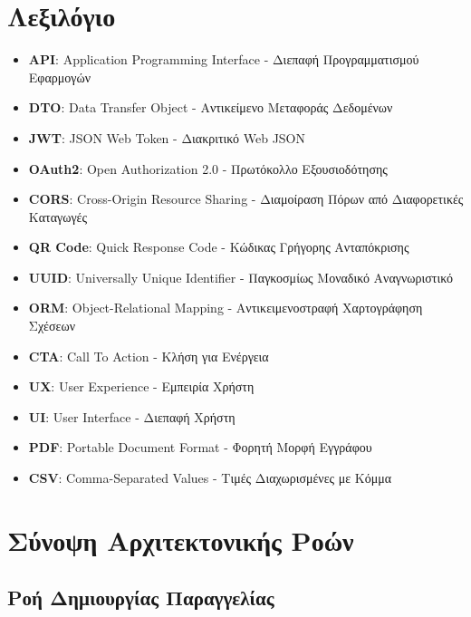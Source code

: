 \documentclass[12pt,a4paper]{report}
\begin{document}
\chapter{Λεξιλόγιο}

\begin{itemize}
    \item \textbf{API}: Application Programming Interface - Διεπαφή Προγραμματισμού Εφαρμογών
    \item \textbf{DTO}: Data Transfer Object - Αντικείμενο Μεταφοράς Δεδομένων
    \item \textbf{JWT}: JSON Web Token - Διακριτικό Web JSON
    \item \textbf{OAuth2}: Open Authorization 2.0 - Πρωτόκολλο Εξουσιοδότησης
    \item \textbf{CORS}: Cross-Origin Resource Sharing - Διαμοίραση Πόρων από Διαφορετικές Καταγωγές
    \item \textbf{QR Code}: Quick Response Code - Κώδικας Γρήγορης Ανταπόκρισης
    \item \textbf{UUID}: Universally Unique Identifier - Παγκοσμίως Μοναδικό Αναγνωριστικό
    \item \textbf{ORM}: Object-Relational Mapping - Αντικειμενοστραφή Χαρτογράφηση Σχέσεων
    \item \textbf{CTA}: Call To Action - Κλήση για Ενέργεια
    \item \textbf{UX}: User Experience - Εμπειρία Χρήστη
    \item \textbf{UI}: User Interface - Διεπαφή Χρήστη
    \item \textbf{PDF}: Portable Document Format - Φορητή Μορφή Εγγράφου
    \item \textbf{CSV}: Comma-Separated Values - Τιμές Διαχωρισμένες με Κόμμα
\end{itemize}

\chapter{Σύνοψη Αρχιτεκτονικής Ροών}

\section{Ροή Δημιουργίας Παραγγελίας}
\end{document}

